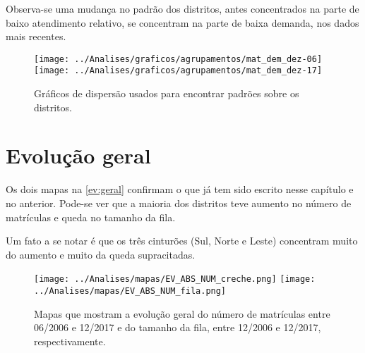 Observa-se uma mudança no padrão dos distritos, antes concentrados na parte de baixo atendimento relativo, se concentram na parte de baixa demanda, nos dados mais recentes.

\begin{figure}[H]
	\centering
	\texttt{[image: ../Analises/graficos/agrupamentos/mat\_dem\_dez-06]}
	\texttt{[image: ../Analises/graficos/agrupamentos/mat\_dem\_dez-17]}
	\caption{Gráficos de dispersão usados para encontrar padrões sobre os distritos.}
	\label{graf:geral}
\end{figure}

\section{Evolução geral}

Os dois mapas na \autoref{ev:geral} confirmam o que já tem sido escrito nesse capítulo e no anterior. Pode-se ver que a maioria dos distritos teve aumento no número de matrículas e queda no tamanho da fila.

Um fato a se notar é que os três cinturões (Sul, Norte e Leste) concentram muito do aumento e muito da queda supracitadas.

\begin{figure}[H]
	\centering
	\texttt{[image: ../Analises/mapas/EV\_ABS\_NUM\_creche.png]}
	\texttt{[image: ../Analises/mapas/EV\_ABS\_NUM\_fila.png]}
	\caption{Mapas que mostram a evolução geral do número de matrículas entre 06/2006 e 12/2017 e do tamanho da fila, entre 12/2006 e 12/2017, respectivamente.}
	\label{ev:geral}
\end{figure}

